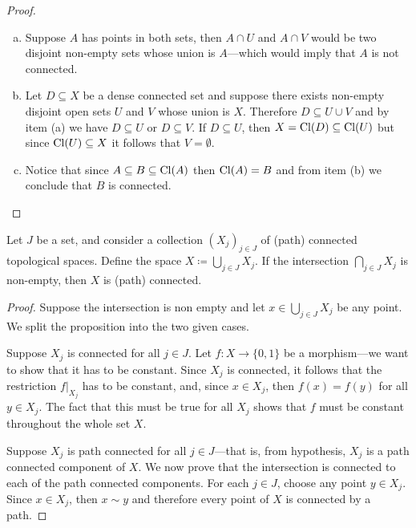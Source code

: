 \begin{proof}
\begin{enumerate}[(a)]\setlength\itemsep{0em}
\item Suppose \(A\) has points in both sets, then \(A \cap U\) and \(A \cap V\)
  would be two disjoint non-empty sets whose union is \(A\)---which would
  imply that \(A\) is not connected.

\item Let \(D \subseteq X\) be a dense connected set and suppose there exists
  non-empty disjoint open sets \(U\) and \(V\) whose union is \(X\). Therefore
  \(D \subseteq U \cup V\) and by item (a) we have \(D \subseteq U\) or \(D
  \subseteq V\). If \(D \subseteq U\), then \(X = \operatorname{Cl}(D) \subseteq \operatorname{Cl}(U)\) but
  since \(\operatorname{Cl}(U) \subseteq X\) it follows that \(V = \emptyset\).

\item Notice that since \(A \subseteq B \subseteq \operatorname{Cl}(A)\) then \(\operatorname{Cl}(A) = B\)
  and from item (b) we conclude that \(B\) is connected.
\end{enumerate}
\end{proof}

\begin{proposition}
\label{prop:union-path-connected}
Let \(J\) be a set, and consider a collection \((X_j)_{j \in J}\) of (path)
connected topological spaces. Define the space
\(X \coloneq \bigcup_{j \in J} X_j\). If the intersection
\(\bigcap_{j \in J} X_j\) is non-empty, then \(X\) is (path) connected.
\end{proposition}

\begin{proof}
Suppose the intersection is non empty and let \(x \in \bigcup_{j \in J}
X_j\) be any point. We split the proposition into the two given cases.

Suppose \(X_j\) is connected for all \(j \in J\). Let \(f: X \to \{0, 1\}\) be a
morphism---we want to show that it has to be constant. Since \(X_j\) is
connected, it follows that the restriction \(f|_{X_j}\) has to be constant, and,
since \(x \in X_j\), then \(f(x) = f(y)\) for all \(y \in X_j\). The fact that
this must be true for all \(X_j\) shows that \(f\) must be constant throughout
the whole set \(X\).

Suppose \(X_j\) is path connected for all \(j \in J\)---that is, from
hypothesis, \(X_j\) is a path connected component of \(X\). We now prove that
the intersection is connected to each of the path connected components. For each
\(j \in J\), choose any point \(y \in X_j\). Since \(x \in X_j\), then
\(x \sim y\) and therefore every point of \(X\) is connected by a path.
\end{proof}


